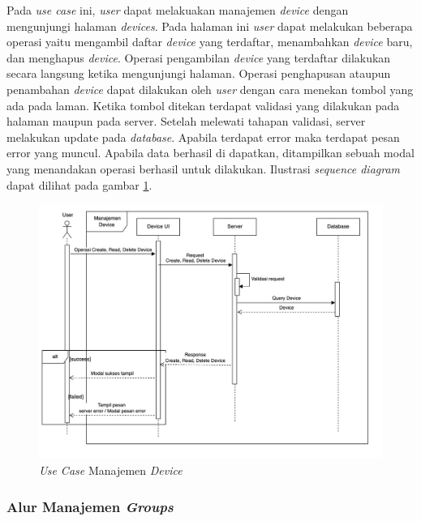 Pada \textit{use case} ini, \textit{user} dapat melakuakan manajemen \textit{device} dengan mengunjungi halaman \textit{devices}. Pada halaman ini \textit{user} dapat melakukan beberapa operasi yaitu mengambil daftar \textit{device} yang terdaftar, menambahkan \textit{device} baru, dan menghapus \textit{device}. Operasi pengambilan \textit{device} yang terdaftar dilakukan secara langsung ketika mengunjungi halaman. Operasi penghapusan ataupun penambahan \textit{device} dapat dilakukan oleh \textit{user} dengan cara menekan tombol yang ada pada laman. Ketika tombol ditekan terdapat validasi yang dilakukan pada halaman maupun pada server. Setelah melewati tahapan validasi, server melakukan update pada \textit{database}. Apabila terdapat error maka terdapat pesan error yang muncul. Apabila data berhasil di dapatkan, ditampilkan sebuah modal yang menandakan operasi berhasil untuk dilakukan. Ilustrasi \textit{sequence diagram} dapat dilihat pada gambar \ref{fig:usecase-08}.


\begin{figure}[ht]
  \centering
  \includegraphics[width=1\textwidth]{resources/chapter-3/usecase/uc-08.jpg}
  \caption{\textit{Use Case} Manajemen \textit{Device}}
  \label{fig:usecase-08}
\end{figure}

\pagebreak

\subsubsection{Alur Manajemen \textit{Groups}}

